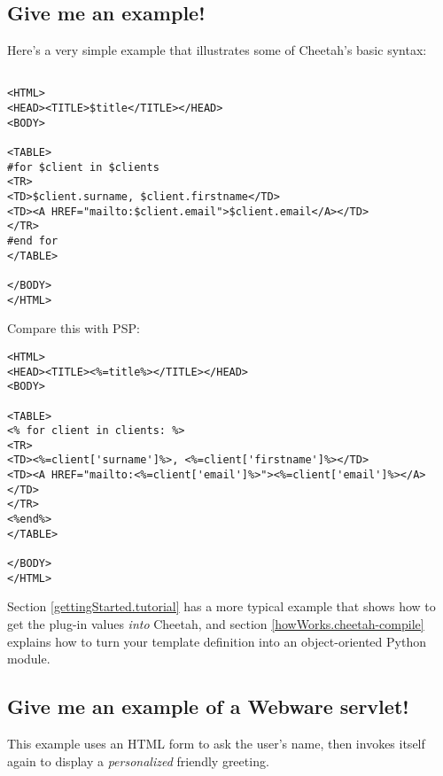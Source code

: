 \subsection{Give me an example!}
\label{intro.example}

Here's a very simple example that illustrates some of Cheetah's basic syntax:

\begin{verbatim}

<HTML>
<HEAD><TITLE>$title</TITLE></HEAD>
<BODY>

<TABLE>
#for $client in $clients
<TR>
<TD>$client.surname, $client.firstname</TD>
<TD><A HREF="mailto:$client.email">$client.email</A></TD>
</TR>
#end for
</TABLE>

</BODY>
</HTML>
\end{verbatim}

Compare this with PSP:

\begin{verbatim}
<HTML>
<HEAD><TITLE><%=title%></TITLE></HEAD>
<BODY>

<TABLE>
<% for client in clients: %>
<TR>
<TD><%=client['surname']%>, <%=client['firstname']%></TD>
<TD><A HREF="mailto:<%=client['email']%>"><%=client['email']%></A></TD>
</TR>
<%end%>
</TABLE>

</BODY>
</HTML>
\end{verbatim}

Section \ref{gettingStarted.tutorial} has a more typical example that shows
how to get the plug-in values {\em into} Cheetah, and section
\ref{howWorks.cheetah-compile} explains how to turn your template definition
into an object-oriented Python module.



\subsection{Give me an example of a Webware servlet!}
\label{intro.example.servlet}

This example uses an HTML form to ask the user's name, then invokes itself
again to display a {\em personalized} friendly greeting.  

